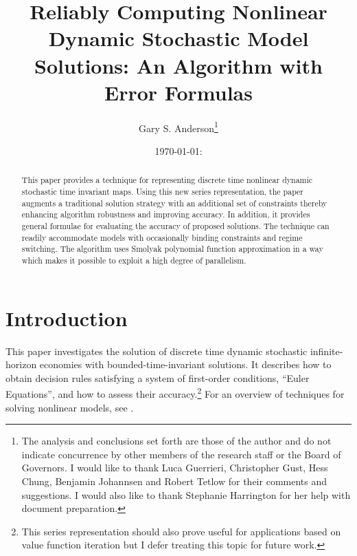 \documentclass[12pt]{article}
\author{Gary S. Anderson\thanks{The analysis and conclusions set forth are those of the author and do not indicate concurrence by other members of the research staff or the Board of Governors. I would like to thank Luca Guerrieri, Christopher Gust, Hess Chung, Benjamin Johannsen  and Robert Tetlow for their comments and suggestions.  I would also like to thank Stephanie Harrington for her help with document preparation.
}}
\title{Reliably Computing
  Nonlinear Dynamic Stochastic Model Solutions: 
An Algorithm with Error Formulas } %
\date{\today: \currenttime}
\begin{document}



\maketitle

\begin{abstract}
This paper provides a technique for representing  discrete time  nonlinear dynamic stochastic time invariant maps.
Using this new series representation, the paper 
augments a traditional solution strategy with an additional set of
constraints thereby enhancing algorithm robustness and improving accuracy.
In addition, it provides general
formulae for evaluating the accuracy of proposed solutions.
The technique can readily accommodate models with occasionally binding constraints and regime switching. 
The  algorithm  uses
Smolyak polynomial function approximation  in a way which makes it possible to exploit a high degree of parallelism.







\end{abstract}

\newpage
\tableofcontents
\newpage

\section{Introduction}

This paper investigates the solution of discrete time  dynamic stochastic
infinite-horizon economies with bounded-time-invariant solutions.
It describes how to obtain decision rules satisfying a system of 
first-order conditions, ``Euler Equations'',  and how to assess their accuracy.\footnote{This series 
representation should also prove useful for applications based on
value function iteration but I  defer treating this topic for
 future work.
}
 For an overview of techniques for solving nonlinear models,
see \citep{judd92,Christiano2000,doraszelskiy04,gaspar97,Judd2014,marcet.lorenzoni99,juddGSSA2011,maliarmovingbounds,RePEc:bny:wpaper:0058,JuddIntegrals}.
\end{document}
